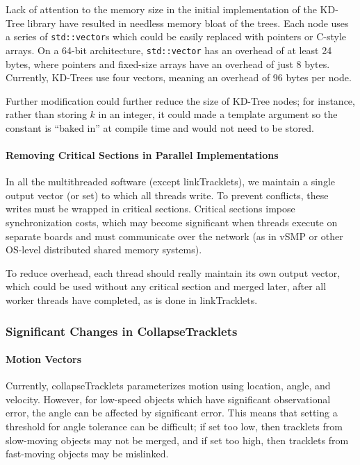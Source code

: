 Lack of attention to the memory size in the initial implementation of
the KD-Tree library have resulted in needless memory bloat of the
trees.  Each node uses a series of \texttt{std::vector}s which could
be easily replaced with pointers or C-style arrays.  On a 64-bit
architecture, \texttt{std::vector} has an overhead of at least 24
bytes, where pointers and fixed-size arrays have an overhead of just 8
bytes.  Currently, KD-Trees use four vectors, meaning an overhead of
96 bytes per node.

Further modification could further reduce the size of KD-Tree nodes;
for instance, rather than storing $k$ in an integer, it could made a
template argument so the constant is ``baked in'' at compile time and
would not need to be stored.  

\paragraph{Removing Critical Sections in Parallel Implementations}
In all the multithreaded software (except linkTracklets), we maintain
a single output vector (or set) to which all threads write.  To
prevent conflicts, these writes must be wrapped in critical sections.
Critical sections impose synchronization costs, which may become
significant when threads execute on separate boards and must
communicate over the network (as in vSMP or other OS-level distributed
shared memory systems).

To reduce overhead, each thread should really maintain its own output
vector, which could be used without any critical section and merged
later, after all worker threads have completed, as is done in linkTracklets.

\subsubsection{Significant Changes in CollapseTracklets}
\paragraph{Motion Vectors} 
Currently, collapseTracklets parameterizes motion using location,
angle, and velocity.  However, for low-speed objects which have
significant observational error, the angle can be affected by
significant error.  This means that setting a threshold for angle
tolerance can be difficult; if set too low, then tracklets from
slow-moving objects may not be merged, and if set too high, then
tracklets from fast-moving objects may be mislinked.

